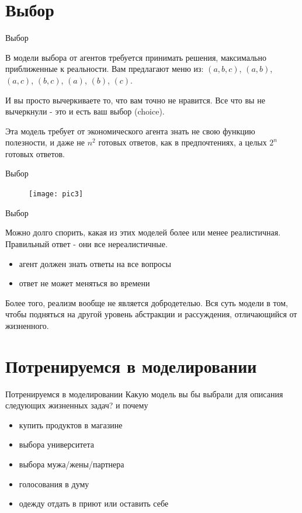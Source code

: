 \documentclass{beamer}
\begin{document}
\section{Выбор}

\begin{frame}{Выбор}

В модели выбора от агентов требуется принимать решения, максимально приближенные к реальности. Вам предлагают меню из: $(a,b,c)$, $(a,b)$, $(a,c)$, $(b,c)$, $(a)$, $(b)$, $(c)$.

И вы просто вычеркиваете то, что вам точно не нравится. Все что вы не вычеркнули - это и есть ваш выбор (\alert{choice}). 

Эта модель требует от экономического агента знать не свою функцию полезности, и даже не $n^2$ готовых ответов, как в предпочтениях, а целых $2^n$ готовых ответов.

\end{frame}

\begin{frame}{Выбор}

\begin{figure}[hbt]
\centering
\texttt{[image: pic3]}
\end{figure}

\end{frame}

\begin{frame}{Выбор}

Можно долго спорить, какая из этих моделей более или менее реалистичная. Правильный ответ - они все нереалистичные. 

\begin{itemize}
  \item агент должен знать ответы на все вопросы
  \item ответ не может меняться во времени
\end{itemize}


Более того, реализм вообще не является добродетелью. Вся суть модели в том, чтобы подняться на другой уровень абстракции и рассуждения, отличающийся от жизненного.
\end{frame}

\section{Потренируемся в моделировании}

\begin{frame}{Потренируемся в моделировании}
	Какую модель вы бы выбрали для описания следующих жизненных задач? и почему

\begin{itemize}
  \item купить продуктов в магазине
  \item выбора университета
  \item выбора мужа/жены/партнера
  \item голосования в думу
  \item одежду отдать в приют или оставить себе
\end{itemize}	
	
\end{frame}
\end{document}
